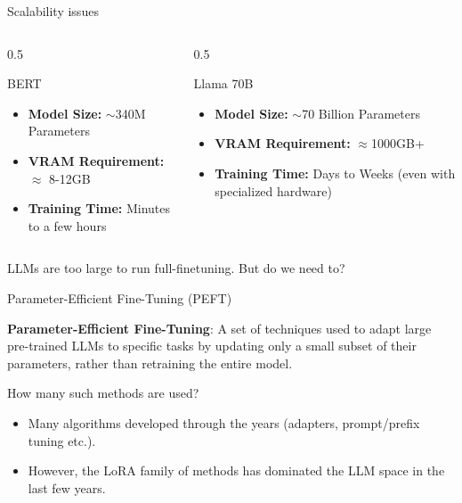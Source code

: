 \documentclass[24pt]{beamer}
\begin{document}
\begin{frame}{Scalability issues}
    \begin{columns}
        \begin{column}{0.5\textwidth}
            \begin{block}{BERT}
                \centering
                \begin{itemize}
                    \item \textbf{Model Size:} $\sim$340M Parameters \item
                    \textbf{VRAM Requirement:} $\approx$ 8-12GB \item
                    \textbf{Training Time:} Minutes to a few hours
                \end{itemize}
            \end{block}
        \end{column}

        \begin{column}{0.5\textwidth}
            \begin{block}{Llama 70B}
                \centering
                \begin{itemize}
                    \item \textbf{Model Size:} $\sim$70 Billion Parameters
                    \item \textbf{VRAM Requirement:} $\approx$1000GB+ \item
                    \textbf{Training Time:} Days to Weeks (even with
                    specialized hardware)
                \end{itemize}
            \end{block}
        \end{column}
    \end{columns}

    \begin{center}
        LLMs are \alert{too large} to run full-finetuning. But do we need
        to?
    \end{center}
\end{frame}

\begin{frame}{Parameter-Efficient Fine-Tuning (PEFT)}
	\begin{definition}[PEFT]
		\textbf{Parameter-Efficient Fine-Tuning}:  A set of techniques used to adapt large pre-trained LLMs to specific tasks by updating only a \alert{small subset of their parameters}, rather than retraining the entire model.
	\end{definition}
	\begin{block}{How many such methods are used?}
		\begin{itemize}
			\item Many algorithms developed through the years (adapters, prompt/prefix tuning etc.).
			\item However, the \alert{LoRA}  family of methods has dominated the LLM space in the last few years.
		\end{itemize}
	\end{block}
\end{frame}
\end{document}
